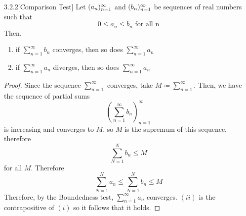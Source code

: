\documentclass[openany]{report}
\begin{document}
\begin{manualprop}{3.2.2}[Comparison Test]
    Let $({a}_n)_{n=1}^\infty$ and $({b}_n)_{n=1}^\infty$ be sequences of real numbers such that
    \[0 \leq a_n \leq b_n \text{ for all n}\]
    Then,
    \begin{enumerate}[label=(\roman*)]
        \item if $\sum\limits_{n=1}^\infty b_n$ converges, then so does $\sum\limits_{n=1}^\infty a_n$
        \item if $\sum\limits_{n=1}^\infty a_n$ diverges, then so does $\sum\limits_{n=1}^\infty a_n$
    \end{enumerate}
\end{manualprop}
\begin{proof}
    Since the sequence $\sum\limits_{n=1}^\infty$ converges, take $M \coloneqq \sum\limits_{n=1}^\infty$. Then, we have the sequence of partial sums 
    \[\left(\sum_{n=1}^\infty b_n\right)_{n=1}^\infty\]
    is increasing and converges to $M$, so $M$ is the supremum of this sequence, therefore
    \[\sum_{N=1}^N b_n \leq M \]
    for all $M$. Therefore
    \[\sum_{N=1}^N a_n \leq \sum_{N=1}^N b_n \leq M\]
    Therefore, by the Boundedness test, $\sum\limits_{n=1}^\infty a_n$ converges. $(ii)$ is the contrapositive of $(i)$ so it follows that it holds. 
\end{proof}
\end{document}
